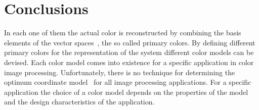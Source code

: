 \documentclass[10pt,twocolumn,letterpaper]{article}
\begin{document}
\section{Conclusions}
 In each one of them the actual color is reconstructed by combining the basis elements of the vector spaces~\cite{Mackey2006Vector}, the so called primary colors. By defining different primary colors for the representation of the system different color models can be devised. Each color model comes into existence for a specific application in color image processing. Unfortunately, there is no technique for determining the optimum coordinate model~\cite{Bleck1992Salinity} for all image processing applications. For a specific application the choice of a color model depends on the properties of the model and the design characteristics of the application.

{\small


}
\end{document}
